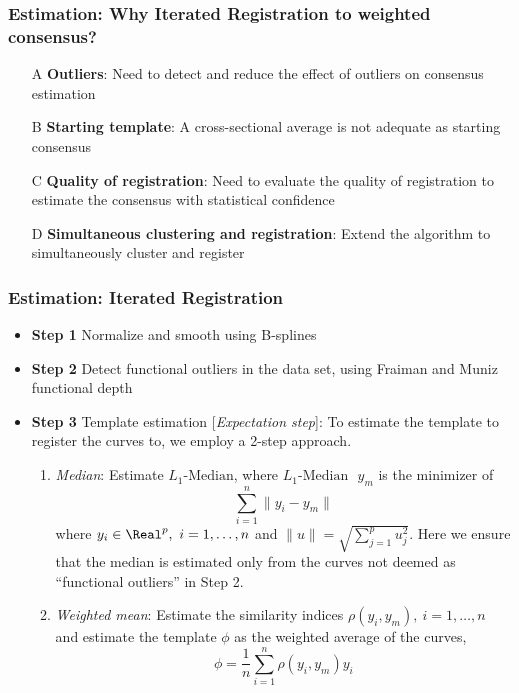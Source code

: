 \documentclass[10pt,dvipsnames,table]{beamer}
\begin{document}
\begin{frame}
\frametitle{Estimation: Why Iterated Registration to weighted consensus?}
\begin{enumerate}
\item[A] {\bf{Outliers}}: Need to detect and reduce the effect of outliers on consensus estimation

\item[B] {\bf{Starting template}}: A cross-sectional average is not adequate as starting consensus

\item[C] {\bf{Quality of registration}}: Need to evaluate the quality of registration to estimate the consensus with statistical confidence

\item[D] {\bf{Simultaneous clustering and registration}}: Extend the algorithm to simultaneously cluster and register
\end{enumerate}
\end{frame}

\begin{frame}
\frametitle{Estimation: Iterated Registration}
\begin{itemize}
\pause
\item {\bf{Step 1}} Normalize and smooth using B-splines
\pause
\item {\bf{Step 2}} Detect functional outliers in the data set, using Fraiman and Muniz functional depth
\pause
\item {\bf{Step 3}} Template estimation [{\emph{Expectation step}}]: To estimate the template to register the curves to, we employ a 2-step approach. 
\begin{enumerate}
\pause
\item {\emph{Median}}: Estimate $L_1\text{-Median}$, where $L_1\text{-Median }$ $y_m$ is the minimizer of 
\[ \sum\limits_{i = 1}^n \|y_i - y_m \| \]
where $y_i \in \Real^p, \ i = 1,\dots,n$ and $\|u \| = \sqrt{\sum\limits_{j = 1}^p u_j^2}$. Here we ensure that the median is estimated only from the curves not deemed as ``functional outliers'' in Step 2. 
\pause
\item {\emph{Weighted mean}}: Estimate the similarity indices $\rho(y_i, y_m), \ i = 1,\dots,n$ and estimate the template $\phi$ as the weighted average of the curves, 
\[ \phi = \frac{1}{n}\sum\limits_{i = 1}^n \rho(y_i, y_m) y_i \]
\end{enumerate}
\end{itemize}
\end{frame}
\end{document}
